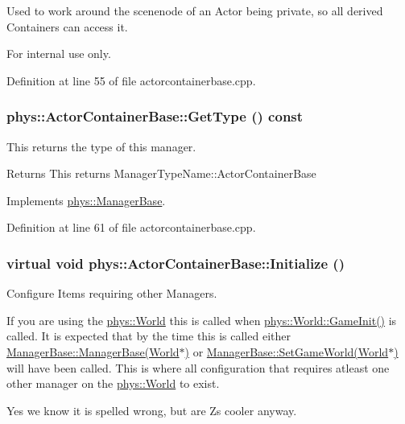Used to work around the scenenode of an Actor being private, so all derived Containers can access it. 

\begin{DoxyInternal}{For internal use only.}
\end{DoxyInternal}


Definition at line 55 of file actorcontainerbase.cpp.

\hypertarget{classphys_1_1ActorContainerBase_aa86380fd1b18d660f68b60f075967cf8}{
\subsubsection[{GetType}]{ phys::ActorContainerBase::GetType () const}}
\label{d1/d00/classphys_1_1ActorContainerBase_aa86380fd1b18d660f68b60f075967cf8}


This returns the type of this manager. 

\begin{DoxyReturn}{Returns}
This returns ManagerTypeName::ActorContainerBase 
\end{DoxyReturn}


Implements \hyperlink{classphys_1_1ManagerBase_aff400b6599db635e24796d8221e9a0e3}{phys::ManagerBase}.



Definition at line 61 of file actorcontainerbase.cpp.

\hypertarget{classphys_1_1ActorContainerBase_af36d5866e0ee9f6f450a4e62642e0928}{
\subsubsection[{Initialize}]{\setlength{\rightskip}{0pt plus 5cm}virtual void phys::ActorContainerBase::Initialize ()}}
\label{d1/d00/classphys_1_1ActorContainerBase_af36d5866e0ee9f6f450a4e62642e0928}


Configure Items requiring other Managers. 

If you are using the \hyperlink{classphys_1_1World}{phys::World} this is called when \hyperlink{classphys_1_1World_a21cc36be08a61f40619584d4c438936b}{phys::World::GameInit()} is called. It is expected that by the time this is called either \hyperlink{classphys_1_1ManagerBase_ab9ad12416f771d95fe8a6d953923c634}{ManagerBase::ManagerBase(World$\ast$)} or \hyperlink{classphys_1_1ManagerBase_a97eb1e77c1f7a0925fc623836368a262}{ManagerBase::SetGameWorld(World$\ast$)} will have been called. This is where all configuration that requires atleast one other manager on the \hyperlink{classphys_1_1World}{phys::World} to exist.\par
\par
 Yes we know it is spelled wrong, but are Zs cooler anyway. 

